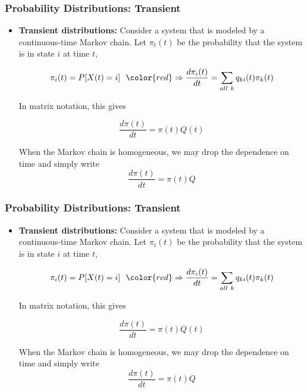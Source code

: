 \begin{frame}
    \frametitle{Probability Distributions: Transient}

        \begin{itemize}

            \item \textbf{Transient distributions:} Consider a system that is modeled by a continuous-time Markov chain. 
            Let $\pi_t(t)$ be the probability that the system is in state $i$ at time $t$,

            $$\pi_i(t) = P[X(t) = i]~~{\color{red}\Rightarrow \frac{d\pi_i(t)}{dt}=\sum_{all~k}q_{ki}(t)\pi_k(t)}$$

            In matrix notation, this gives

            $$\frac{d\pi(t)}{dt} = \pi(t)Q(t)$$

            When the Markov chain is homogeneous, we may drop the dependence on time and simply write
            $$\frac{d\pi(t)}{dt} = \pi(t)Q$$

        \end{itemize}
\end{frame}

\begin{frame}
    \frametitle{Probability Distributions: Transient}

        \begin{itemize}

            \item \textbf{Transient distributions:} Consider a system that is modeled by a continuous-time Markov chain. 
            Let $\pi_t(t)$ be the probability that the system is in state $i$ at time $t$,

            $$\pi_i(t) = P[X(t) = i]~~{\color{red}\Rightarrow \frac{d\pi_i(t)}{dt}=\sum_{all~k}q_{ki}(t)\pi_k(t)}$$

            In matrix notation, this gives

            $$\frac{d\pi(t)}{dt} = \pi(t)Q(t)$$

            When the Markov chain is homogeneous, we may drop the dependence on time and simply write
            $$\frac{d\pi(t)}{dt} = \pi(t)Q$$

        \end{itemize}
\end{frame}


